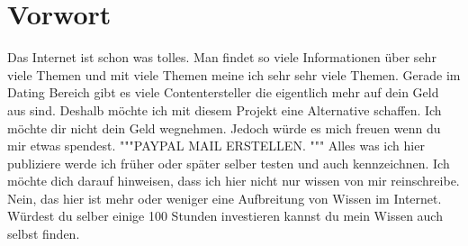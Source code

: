 \chapter*{Vorwort}
Das Internet ist schon was tolles. Man findet so viele Informationen über sehr viele Themen und mit viele Themen meine ich sehr sehr viele Themen. Gerade im Dating Bereich gibt es viele Contentersteller die eigentlich mehr auf dein Geld aus sind. Deshalb möchte ich mit diesem Projekt eine Alternative schaffen. Ich möchte dir nicht dein Geld wegnehmen. Jedoch würde es mich freuen wenn du mir etwas spendest. """PAYPAL MAIL ERSTELLEN. """ Alles was ich hier publiziere werde ich früher oder später selber testen und auch kennzeichnen. Ich möchte dich darauf hinweisen, dass ich hier nicht nur wissen von mir reinschreibe. Nein, das hier ist mehr oder weniger eine Aufbreitung von Wissen im Internet. Würdest du selber einige 100 Stunden investieren kannst du mein Wissen auch selbst finden. 